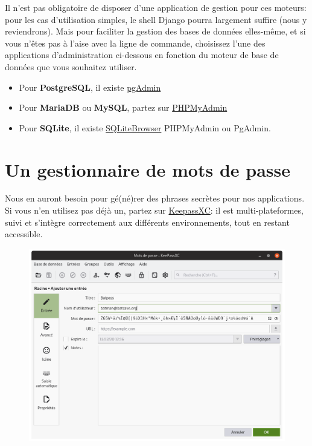 \documentclass[11pt]{amsbook}
\begin{document}
Il n’est pas obligatoire de disposer d’une application de gestion pour ces moteurs: pour les cas d’utilisation simples, le shell Django pourra largement suffire (nous y reviendrons).
Mais pour faciliter la gestion des bases de données elles-même, et si vous n’êtes pas à l’aise avec la ligne de commande, choisissez l’une des applications d’administration ci-dessous en fonction du moteur de base de données que vous souhaitez utiliser.


\begin{itemize}

\item Pour \textbf{PostgreSQL}, il existe \href{https://www.pgadmin.org/}{pgAdmin}

\item Pour \textbf{MariaDB} ou \textbf{MySQL}, partez sur \href{https://www.phpmyadmin.net/}{PHPMyAdmin}

\item Pour \textbf{SQLite}, il existe \href{https://sqlitebrowser.org/}{SQLiteBrowser}
PHPMyAdmin ou PgAdmin.

\end{itemize}


\hypertarget{x-un-gestionnaire-de-mots-de-passe}{\section{Un gestionnaire de mots de passe}}
Nous en auront besoin pour gé(né)rer des phrases secrètes pour nos applications.
Si vous n’en utilisez pas déjà un, partez sur \href{https://keepassxc.org/}{KeepassXC}: il est multi-plateformes, suivi et s’intègre correctement aux différents environnements, tout en restant accessible.


\begin{figure}[h]{}
\centering\includegraphics[width=2.5truein]{images/environment/keepass.png}


\end{figure}
\end{document}
